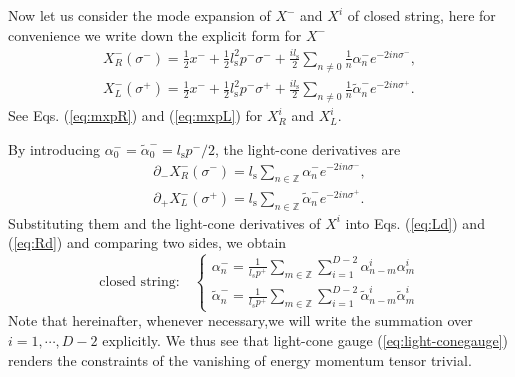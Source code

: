 \documentclass[graybox,envcountchap,sectrefs]{svmono}
\begin{document}
Now let us consider the mode expansion of $X^-$ and $X^{i}$ of closed string, here for convenience we write down the explicit form for $X^-$
\begin{align}
X_{R}^{-}(\sigma^-)=\frac{1}{2}x^{-}+\frac{1}{2} l_{\mathrm{s}}^2 p^{-} \sigma^{-}+\frac{il_{\mathrm{s}}}{2}\sum_{n\neq 0}\frac{1}{n}\alpha^{-}_ne^{-2in\sigma^-},\\
X_{L}^{-}(\sigma^+)=\frac{1}{2}x^{-}+\frac{1}{2} l_{\mathrm{s}}^2 p^{-} \sigma^{+}+\frac{il_{\mathrm{s}}}{2}\sum_{n\neq 0}\frac{1}{n}\tilde{\alpha}^{-}_ne^{-2in\sigma^+}.
\end{align}
See Eqs. (\ref{eq:mxpR}) and  (\ref{eq:mxpL}) for $X^i_R$ and $X^i_L$.

By introducing $\alpha_0^{-}=\tilde{\alpha}_0^{-}=l_{\mathrm{s}}p^{-}/2$, the light-cone derivatives are
\begin{align}
\partial_{-}X_{R}^{-}(\sigma^-)=l_{\mathrm{s}}\sum_{n\in \mathbb{Z}}\alpha_n^-e^{-2in \sigma^-},\\
\partial_{+}X_{L}^{-}(\sigma^+)=l_{\mathrm{s}}\sum_{n\in \mathbb{Z}}\tilde{\alpha}_n^-e^{-2in \sigma^+}.
\end{align}
Substituting them and the light-cone derivatives of $X^i$ into Eqs. (\ref{eq:Ld}) and (\ref{eq:Rd}) and comparing two sides, we obtain 
\begin{equation}\boxed{
\text{closed string:}\quad
 \begin{cases}
\alpha_{n}^{-}=\frac{1}{l_{s} p^{+}}  \sum_{m\in \mathbb{Z}} \sum_{i=1}^{D-2}\alpha_{n-m}^{i} \alpha_{m}^{i} \\
\tilde{\alpha}_{n}^{-}=\frac{1}{l_{s} p^{+}} \sum_{m\in \mathbb{Z}} \sum_{i=1}^{D-2} \tilde{\alpha}_{n-m}^{i} \tilde{\alpha}_{m}^{i}
\end{cases} \label{eq:alphaXm}
} 
\end{equation}
Note that hereinafter, whenever necessary,we will write the summation over $i=1,\cdots,D-2$ explicitly. We thus see that light-cone gauge (\ref{eq:light-conegauge}) renders the constraints of the vanishing of energy momentum tensor trivial.
\end{document}
